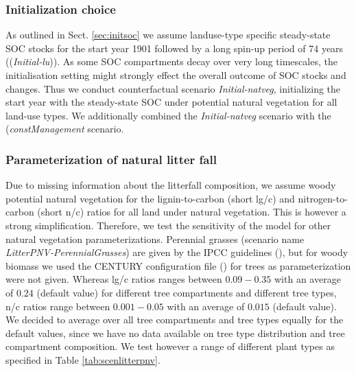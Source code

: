 \documentclass[gc, manuscript]{copernicus}
\begin{document}
\hypertarget{sec:scen_initial}{%
\subsubsection{Initialization choice}\label{sec:scen_initial}}

As outlined in Sect. \ref{sec:initsoc} we assume landuse-type specific steady-state SOC stocks for the start year 1901 followed by a long spin-up period of 74 years ((\textit{Initial-lu})). As some SOC compartments decay over very long timescales, the initialisation setting might strongly effect the overall outcome of SOC stocks and changes. Thus we conduct counterfactual scenario \textit{Initial-natveg}, initializing the start year with the steady-state SOC under potential natural vegetation for all land-use types. We additionally combined the \textit{Initial-natveg} scenario with the (\textit{constManagement} scenario.

\hypertarget{sec:scenlitterpnv}{%
\subsubsection{Parameterization of natural litter fall}\label{sec:scenlitterpnv}}

Due to missing information about the litterfall composition, we assume woody potential natural vegetation for the lignin-to-carbon (short lg/c) and nitrogen-to-carbon (short n/c) ratios for all land under natural vegetation. This is however a strong simplification. Therefore, we test the sensitivity of the model for other natural vegetation parameterizations. Perennial grasses (scenario name \textit{LitterPNV-PerennialGrasses}) are given by the IPCC guidelines (\citep{calvo_buendia_ipcc_2019}), but for woody biomass we used the CENTURY configuration file (\citep{century_model_2000}) for trees as parameterization were not given. Whereas lg/c ratios ranges between \(0.09-0.35\) with an average of \(0.24\) (default value) for different tree compartments and different tree types, n/c ratios range between \(0.001-0.05\) with an average of \(0.015\) (default value). We decided to average over all tree compartments and tree types equally for the default values, since we have no data available on tree type distribution and tree compartment composition. We test however a range of different plant types as specified in Table \ref{tab:scenlitterpnv}.
\end{document}
